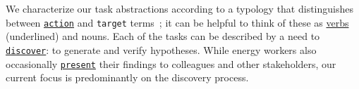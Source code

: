 \documentclass[journal]{vgtc}                %
\begin{document}
        
        
        
        
        
        
        
        
        

We characterize our task abstractions according to a typology that distinguishes between \underline{{\tt action}} and {\tt target} terms~\cite{Munzner2014}; it can be helpful to think of these as \underline{verbs} (underlined) and nouns.
Each of the tasks can be described by a need to \underline{{\tt discover}}: to generate and verify hypotheses.
While energy workers also occasionally \underline{{\tt present}} their findings to colleagues and other stakeholders, our current focus is predominantly on the discovery process. 
\end{document}
